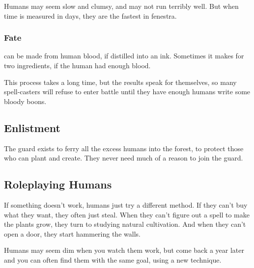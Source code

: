 \begin{multicols}{2}
Humans may seem slow and clumsy, and may not run terribly well.
But when time is measured in days, they are the fastest in \gls{fenestra}.

\subsubsection{Fate }
can be made from human blood, if distilled into an ink.
Sometimes it makes for two \glspl{ingredient}, if the human had enough blood.

This process takes a long time, but the results speak for themselves, so many spell-casters will refuse to enter battle until they have enough humans write some bloody \glspl{boon}.

\subsection{Enlistment}

The \gls{guard} exists to ferry all the excess humans into the forest, to protect those who can plant and create.
They never need much of a reason to join the guard.

\subsection{Roleplaying Humans}

If something doesn't work, humans just try a different method.
If they can't buy what they want, they often just steal.
When they can't figure out a spell to make the plants grow, they turn to studying natural cultivation.
And when they can't open a door, they start hammering the walls.

Humans may seem dim when you watch them work, but come back a year later and you can often find them with the same goal, using a new technique.

\end{multicols}

